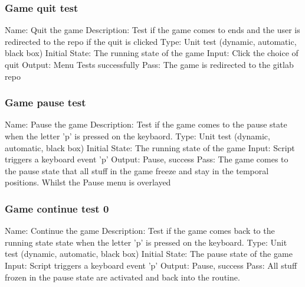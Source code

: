 \documentclass{article}
\begin{document}
\subsubsection{Game quit test}
Name:  Quit the game\newline
Description: Test if the game comes to ends and the user is redirected to
 the repo if the quit is clicked \newline
Type: Unit test (dynamic, automatic, black box) \newline
Initial State:  The running state of the game \newline
Input: Click the choice of quit\newline
Output: Menu Tests successfully \newline
Pass: The game is redirected to the gitlab repo  \newline

\subsubsection{Game pause test}
Name:  Pause the game\newline
Description: Test if the game comes to the pause state when the letter 'p' is 
pressed on the keybaord. \newline
Type: Unit test (dynamic, automatic, black box) \newline
Initial State: The running state of the game \newline
Input: Script triggers a keyboard event 'p'\newline
Output: Pause, success \newline
Pass: The game comes to the pause state that all stuff in the game freeze and 
stay in the temporal positions. Whilst the Pause menu is overlayed  \newline

\subsubsection{Game continue test 0}
Name:  Continue the game\newline
Description: Test if the game comes back to the running state state when the letter 'p' is 
pressed on the keyboard. \newline
Type: Unit test (dynamic, automatic, black box) \newline
Initial State: The pause state of the game\newline
Input: Script triggers a keyboard event 'p'\newline
Output: Pause, success \newline
Pass: All stuff frozen in the pause state are activated and back into the 
routine. \newline
\end{document}
